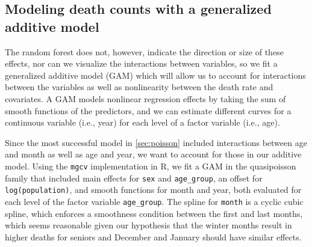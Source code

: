 \documentclass[11pt]{article}
\begin{document}
\subsection{Modeling death counts with a generalized additive model}\label{sec:gam}

The random forest does not, however, indicate the direction or size of these effects, nor can we visualize the interactions between variables, so we fit a generalized additive model (GAM) which will allow us to account for interactions between the variables as well as nonlinearity between the death rate and covariates.
A GAM models nonlinear regression effects by taking the sum of smooth functions of the predictors, and we can estimate different curves for a continuous variable (i.e., year) for each level of a factor variable (i.e., age)\cite{ESL}.

Since the most successful model in \cref{sec:poisson} included interactions between age and month as well as age and year, we want to account for those in our additive model.
Using the \verb+mgcv+ implementation in R\cite{mgcv}, we fit a GAM in the quasipoisson family that included main effects for \verb+sex+ and \verb+age_group+, an offset for \verb+log(population)+,
and smooth functions for month and year, both evaluated for each level of the factor variable \verb+age_group+. 
The spline for \verb+month+ is a cyclic cubic spline, which enforces a smoothness condition between the first and last months, which seems reasonable given our hypothesis that the winter months result in higher deaths for seniors and December and January should have similar effects.
\end{document}
